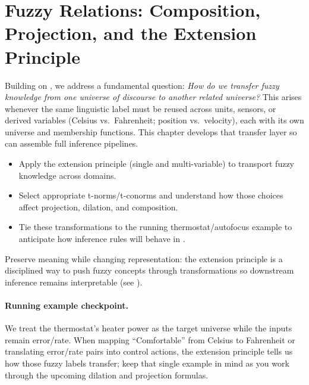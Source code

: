 \section{Fuzzy Relations: Composition, Projection, and the Extension Principle}\label{chap:fuzzyrelations}
\graphicspath{{assets/lec10/}}

Building on , we address a fundamental question: \emph{How do we transfer fuzzy knowledge from one universe of discourse to another related universe?} This arises whenever the same linguistic label must be reused across units, sensors, or derived variables (Celsius vs.\ Fahrenheit; position vs.\ velocity), each with its own universe and membership functions. This chapter develops that transfer layer so  can assemble full inference pipelines.

\begin{tcolorbox}[summarybox, title={Learning Outcomes}]
\begin{itemize}
    \item Apply the extension principle (single and multi-variable) to transport fuzzy knowledge across domains.
    \item Select appropriate t\hyp{}norms/t\hyp{}conorms and understand how those choices affect projection, dilation, and composition.
    \item Tie these transformations to the running thermostat/autofocus example to anticipate how inference rules will behave in .
\end{itemize}
\end{tcolorbox}

\begin{tcolorbox}[summarybox, title={Design motif}]
Preserve meaning while changing representation: the extension principle is a disciplined way to push fuzzy concepts through transformations so downstream inference remains interpretable (see ).
\end{tcolorbox}

\paragraph{Running example checkpoint.}
We treat the thermostat's heater power as the target universe while the inputs remain error/rate. When mapping ``Comfortable'' from Celsius to Fahrenheit or translating error/rate pairs into control actions, the extension principle tells us how those fuzzy labels transfer; keep that single example in mind as you work through the upcoming dilation and projection formulas.


